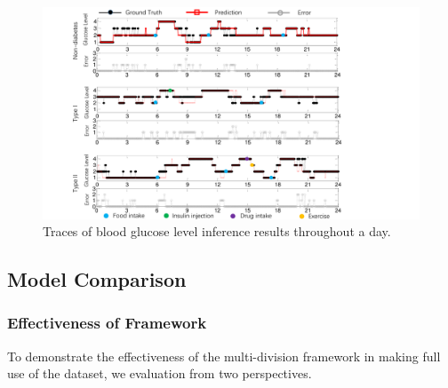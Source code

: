



\begin{figure}[h]
  \centering
  \includegraphics[width=0.8\columnwidth]{./img/pred_vs_gt2.pdf}
  \caption{Traces of blood glucose level inference results throughout a day.}
  \label{fig:pre_gt}
\end{figure}

\subsection{Model Comparison}

\subsubsection{Effectiveness of \modelname Framework}
To demonstrate the effectiveness of the multi-division framework in making full use of the dataset, we evaluation \modelname from two perspectives.

